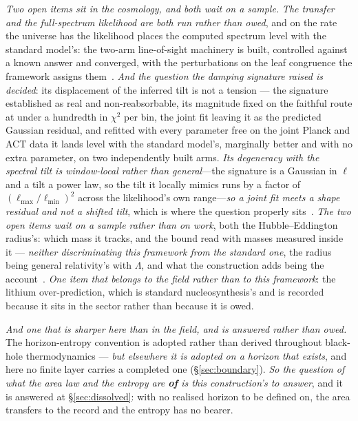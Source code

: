 \documentclass[11pt,a4paper]{article}
\theoremstyle{plain}
\theoremstyle{definition}
\begin{document}
\emph{Two open items sit in the cosmology, and both wait on a sample.} \emph{The transfer and the full-spectrum likelihood are both run
rather than owed}, and on the rate the universe has the likelihood places the computed spectrum level with the
standard model's: the two-arm line-of-sight machinery is built, controlled against a known answer and converged,
with the perturbations on the leaf congruence the framework assigns them~\cite{JanzenCRcosmology}. \emph{And the question the damping signature raised is decided}: its displacement of the inferred tilt is not a tension --- the signature established as real and non-reabsorbable, its magnitude fixed on the
faithful route at under a hundredth in $\chi^{2}$ per bin, the joint fit leaving it as the predicted Gaussian
residual, and refitted with every parameter free on the joint Planck and ACT data it lands level with the
standard model's, marginally better and with no extra parameter, on two independently built arms. \emph{Its degeneracy with
the spectral tilt is window-local rather than general}---the signature is a Gaussian in $\ell$ and a tilt a
power law, so the tilt it locally mimics runs by a factor of $(\ell_{\max}/\ell_{\min})^{2}$ across the
likelihood's own range---\emph{so a joint fit meets a shape residual and not a shifted tilt}, which is where
the question properly sits~\cite{JanzenCRcosmology}. \emph{The two open items wait on a sample rather than on work}, both
the Hubble--Eddington radius's: which mass it tracks, and the bound read with masses measured inside it ---
\emph{neither discriminating this framework from the standard one}, the radius being general relativity's with
$\Lambda$, and what the construction adds being the account~\cite{JanzenSlicing}. \emph{One item that belongs to the field rather than to this framework}: the lithium over-prediction, which
is standard nucleosynthesis's and is recorded because it sits in the sector rather than because it is owed.

\emph{And one that is sharper here than in the field, and is answered rather than owed.} The horizon-entropy convention is adopted rather than derived
throughout black-hole thermodynamics --- \emph{but elsewhere it is adopted on a horizon that exists}, and
here no finite layer carries a completed one (\S\ref{sec:boundary}). \emph{So the question of what the area
law and the entropy are \textbf{of} is this construction's to answer}, and it is answered at
\S\ref{sec:dissolved}: with no realised horizon to be defined on, the area transfers to the record and the
entropy has no bearer.
\end{document}
